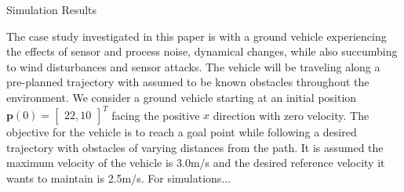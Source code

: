 
\begin{section}{Simulation Results}
\label{sec:simulation}


The case study investigated in this paper is with a ground vehicle experiencing the effects of sensor and process noise, dynamical changes, while also succumbing to wind disturbances and sensor attacks. The vehicle will be traveling along a pre-planned trajectory with assumed to be known obstacles throughout the environment. We consider a ground vehicle starting at an initial position $\bm{p}(0)=\begin{bmatrix} 22,10 \end{bmatrix}^T$ facing the positive $x$ direction with zero velocity. The objective for the vehicle is to reach a goal point while following a desired trajectory with obstacles of varying distances from the path. It is assumed the maximum velocity of the vehicle is 3.0m/s and the desired reference velocity it wants to maintain is 2.5m/s. For simulations...




\begin{figure}[b!th]
\begin{tabular}{ccc}


\end{tabular}
\end{figure}
\end{section}
